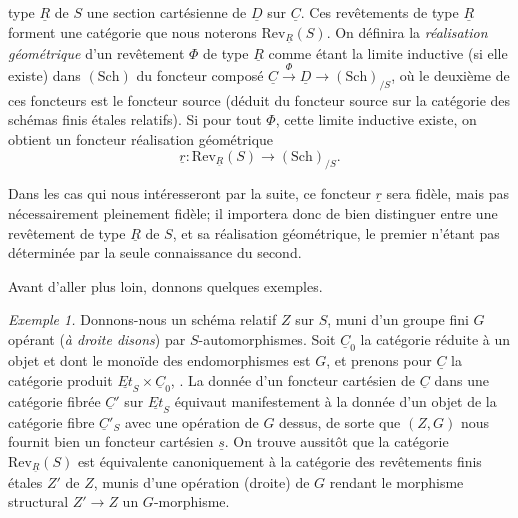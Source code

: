 \documentclass[11pt,a4paper]{article}
\begin{document}
type $\underline{R}$ de $S$ une section cartésienne de $\underline{D}$ sur
$\underline{C}$. Ces revêtements de type $\underline{R}$ forment une catégorie
que nous noterons $\mathrm{Rev}_{\underline{R}}(S)$. On définira la
\emph{réalisation géométrique} d'un revêtement $\Phi$ de type $\underline{R}$
comme étant la limite inductive (si elle existe) dans $(\mathrm{Sch})$ du
foncteur composé $\underline{C} \xrightarrow{\ \Phi\ } \underline{D} \to
(\mathrm{Sch})_{/S}$, où le deuxième de ces foncteurs est le foncteur source
 (déduit du foncteur source sur la
catégorie des schémas finis étales relatifs). Si pour tout $\Phi$, cette limite
inductive existe, on obtient un foncteur réalisation géométrique
\[
  \underline{r} : \mathrm{Rev}_{\underline{R}}(S) \longrightarrow (\mathrm{Sch})_{/S} .
\]

Dans les cas qui nous intéresseront par la suite, ce foncteur $\underline{r}$
sera fidèle, mais pas nécessairement pleinement fidèle; il importera donc de
bien distinguer entre une revêtement de type $\underline{R}$ de $S$, et sa
réalisation géométrique, le premier n'étant pas déterminée par la seule
connaissance du second.

Avant d'aller plus loin, donnons quelques exemples.

\emph{Exemple 1.} Donnons-nous un schéma relatif $Z$ sur $S$, muni d'un groupe
fini $G$ opérant (\emph{à droite disons}) par $S$-automorphismes. Soit
$\underline{C}_0$ la catégorie réduite à un objet et dont le monoïde des
endomorphismes est $G$, et prenons pour $\underline{C}$ la catégorie produit
$\underline{Et}_S \times \underline{C}_0$, . La donnée d'un foncteur cartésien de
$\underline{C}$ dans une catégorie fibrée $\underline{C}'$ sur
$\underline{Et}_S$ équivaut manifestement à la donnée d'un objet de la
catégorie fibre $\underline{C}'_S$ avec une opération de $G$ dessus, de sorte
que $(Z,G)$ nous fournit bien un foncteur cartésien $\underline{s}$. On trouve
aussitôt que la catégorie $\mathrm{Rev}_{\underline{R}}(S)$ est équivalente
canoniquement à la catégorie des revêtements finis étales $Z'$ de $Z$, munis
d'une opération (droite) de $G$ \struck{\ill{}} rendant le morphisme structural
$Z' \to Z$ un $G$-morphisme.
\end{document}
